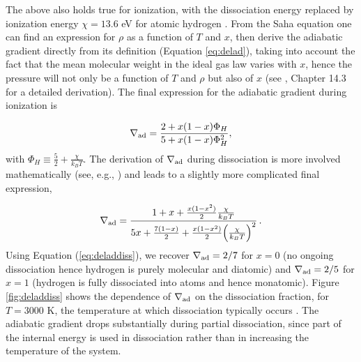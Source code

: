 \documentclass[apj]{emulateapj}
\newcommand{\delad}{\nabla_{\rm ad}}
\begin{document}
The above also holds true for ionization, with the dissociation energy replaced by ionization energy $\chi=13.6$ eV for atomic hydrogen \citep{mandl89}. From the Saha equation one can find an expression for $\rho$ as a function of $T$ and $x$, then derive the adiabatic gradient directly from its definition (Equation \ref{eq:delad}), taking into account the fact that the mean molecular weight in the ideal gas law varies with $x$, hence the pressure will not only be a function of $T$ and $\rho$ but also of $x$ (see \citealt{kippenhahn90}, Chapter 14.3 for a detailed derivation). The final expression for the adiabatic gradient during ionization is 

\begin{equation}
\label{eq:deladioniz}
\delad=\frac{2+x (1-x) \Phi_H}{5+x(1-x)\Phi_H^2},
\end{equation}
with $\Phi_H \equiv \frac{5}{2}+\frac{\chi}{k_B T}$. The derivation of $\delad$ during dissociation is more involved mathematically (see, e.g., \citealt{vardya60}) and leads to a slightly more complicated final expression,



\begin{equation}
\label{eq:deladdiss}
\delad=\frac{1+x+ \frac{x(1-x^2)}{2} \frac{\chi}{k_B T}}{5 x + \frac{7(1-x)}{2} + \frac{x(1-x^2)}{2} \Big(\frac{\chi}{k_B T}\Big)^2} \, .
\end{equation} 
Using Equation (\ref{eq:deladdiss}), we recover $\delad=2/7$ for $x=0$ (no ongoing dissociation hence hydrogen is purely molecular and diatomic) and $\delad=2/5$ for $x=1$ (hydrogen is fully dissociated into atoms and hence monatomic). Figure \ref{fig:deladdiss} shows the dependence of $\delad$ on the dissociation fraction, for $T=3000$ K, the temperature at which dissociation typically occurs \citep{langmuir12}. The adiabatic gradient drops substantially during partial dissociation, since part of the internal energy is used in dissociation rather than in increasing the temperature of the system.
\end{document}
